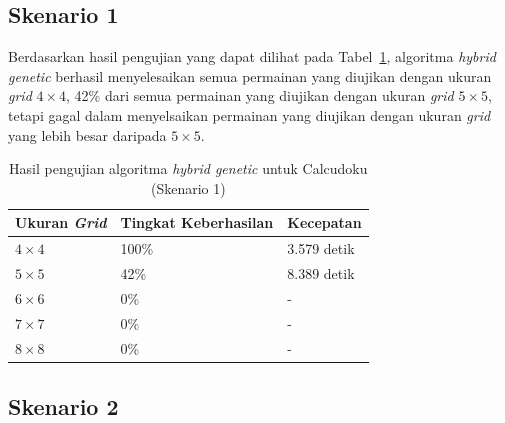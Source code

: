 \subsection{Skenario 1}
\label{sec:skenario1}

Berdasarkan hasil pengujian yang dapat dilihat pada Tabel~\ref{tab:pengujianhg1}, algoritma \textit{hybrid genetic} berhasil menyelesaikan semua permainan yang diujikan dengan ukuran \textit{grid} \begin{math}4 \times 4\end{math}, 42\% dari semua permainan yang diujikan dengan ukuran \textit{grid} \begin{math}5 \times 5\end{math}, tetapi gagal dalam menyelsaikan permainan yang diujikan dengan ukuran \textit{grid} yang lebih besar daripada \begin{math}5 \times 5\end{math}.
\begin{table}
\centering
\captionsetup{justification=centering}
\caption[Hasil pengujian algoritma \textit{hybrid genetic} untuk Calcudoku (Skenario 1)]{Hasil pengujian algoritma \textit{hybrid genetic} untuk Calcudoku (Skenario 1)}
\begin{tabular}{| l | l | l |}
\hline
Ukuran \textit{Grid} & Tingkat Keberhasilan & Kecepatan \\
\hline \hline
\begin{math}4 \times 4\end{math} & 100\% & 3.579 detik \\
\hline
\begin{math}5 \times 5\end{math} & 42\% & 8.389 detik \\
\hline
\begin{math}6 \times 6\end{math} & 0\% & - \\
\hline
\begin{math}7 \times 7\end{math} & 0\% & - \\
\hline
\begin{math}8 \times 8\end{math} & 0\% & - \\
\hline
\end{tabular}
\label{tab:pengujianhg1}
\end{table}

\subsection{Skenario 2}
\label{sec:skenario2}

